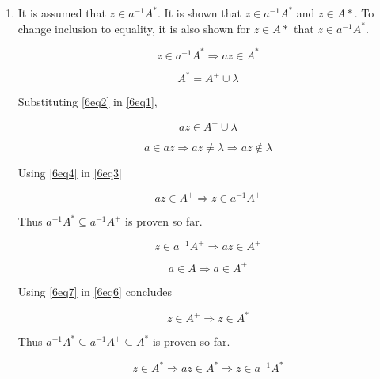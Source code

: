 \begin{enumerate}[label=(\alph*)]

	\item
	It is assumed that $z \in a^{-1}A^*$.
	It is shown that $z \in a^{-1}A^*$ and $z \in A*$.
	To change inclusion to equality, it is also shown for $z\in A*$ that $z \in a^{-1}A^*$.

	\begin{equation}\label{6eq1}
	z \in a^{-1}A^* \Rightarrow az \in A^*
	\end{equation}

	\begin{equation}\label{6eq2}
	A^* = A^+ \cup \lambda
	\end{equation}

	Substituting \eqref{6eq2} in \eqref{6eq1},

	\begin{equation}
	az \in A^+ \cup \lambda \label{6eq3}
	\end{equation}

	\begin{equation}
	a \in az \Rightarrow az \neq \lambda \Rightarrow az \notin \lambda \label{6eq4}
	\end{equation}

	Using \eqref{6eq4} in \eqref{6eq3}

	\begin{equation}
	az \in A^+ \Rightarrow z \in a^{-1}A^+
	\end{equation}

	Thus $a^{-1}A^*\subseteq a^{-1}A^+$ is proven so far.

	\begin{equation}\label{6eq6}
	z \in a^{-1}A^+ \Rightarrow az \in A^+
	\end{equation}

	\begin{equation}\label{6eq7}
	a \in A \Rightarrow a \in A^+
	\end{equation}

	Using \eqref{6eq7} in \eqref{6eq6} concludes

	\begin{equation}
	z \in A^+ \Rightarrow z \in A^*
	\end{equation}

	Thus $a^{-1}A^*\subseteq a^{-1}A^+ \subseteq A^*$ is proven so far.

	\begin{equation}
	z \in A^* \Rightarrow az \in A^* \Rightarrow z \in a^{-1}A^*
	\end{equation}


\end{enumerate}
